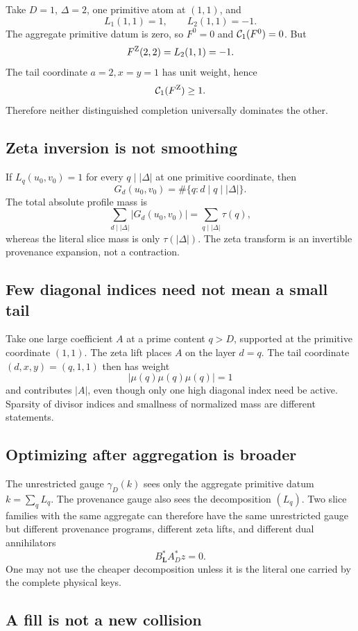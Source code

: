 Take \(D=1\), \(\Delta=2\), one primitive atom at \((1,1)\), and
\[
 L_1(1,1)=1,
 \qquad
 L_2(1,1)=-1.
\]
The aggregate primitive datum is zero, so \(F^0=0\) and
\(\mathcal C_1(F^0)=0\).  But
\[
 F^{\rm Z}(2,2)=L_2(1,1)=-1.
\]
The tail coordinate \(a=2,x=y=1\) has unit weight, hence
\[
 \mathcal C_1(F^{\rm Z})\ge1.
\]
Therefore neither distinguished completion universally dominates the
other.

\subsection{Zeta inversion is not smoothing}

If \(L_q(u_0,v_0)=1\) for every \(q\mid|\Delta|\) at one primitive
coordinate, then
\[
 G_d(u_0,v_0)
 =
 \#\{q:d\mid q\mid|\Delta|\}.
\]
The total absolute profile mass is
\[
 \sum_{d\mid|\Delta|}|G_d(u_0,v_0)|
 =
 \sum_{q\mid|\Delta|}\tau(q),
\]
whereas the literal slice mass is only \(\tau(|\Delta|)\).  The zeta
transform is an invertible provenance expansion, not a contraction.

\subsection{Few diagonal indices need not mean a small tail}

Take one large coefficient \(A\) at a prime content \(q>D\), supported
at the primitive coordinate \((1,1)\).  The
zeta lift places \(A\) on the layer \(d=q\).  The tail coordinate
\((d,x,y)=(q,1,1)\) then has weight
\[
 |\mu(q)\mu(q)\mu(q)|=1
\]
and contributes \(|A|\), even though only one high diagonal index need
be active.  Sparsity of divisor indices and smallness of normalized mass
are different statements.

\subsection{Optimizing after aggregation is broader}

The unrestricted gauge \(\gamma_D(k)\) sees only the aggregate primitive
datum \(k=\sum_qL_q\).  The provenance gauge also sees the decomposition
\((L_q)\).  Two slice families with the same aggregate can therefore
have the same unrestricted gauge but different provenance programs,
different zeta lifts, and different dual annihilators
\[
 B_{\boldsymbol L}^*A_D^*z=0.
\]
One may not use the cheaper decomposition unless it is the literal one
carried by the complete physical keys.

\subsection{A fill is not a new collision}

